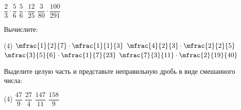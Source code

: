 \begin{class}[number=6]
\begin{listofex}
\begin{tasks}
		\task \( \dfrac{2}{3}\cdot\dfrac{5}{6} \)
		\task \( \dfrac{5}{6}\cdot\dfrac{12}{25} \)
		\task \( \dfrac{3}{80}\cdot\dfrac{100}{291} \)
	\end{tasks}
	\item Вычислите:
		\begin{tasks}(4)
		\task \( \mfrac{1}{2}{7}\cdot\mfrac{1}{1}{3} \)
		\task \( \mfrac{4}{2}{3}\cdot\mfrac{2}{2}{5} \)
		\task \( \mfrac{3}{5}{6}\cdot\mfrac{1}{7}{23} \)
		\task \( \mfrac{7}{3}{11}\cdot\mfrac{2}{19}{40} \)
	\end{tasks}
	\item Выделите целую часть и представьте неправильную дробь в виде смешанного числа:
		\begin{tasks}(4)
		\task \( \dfrac{47}{9} \)
		\task \( \dfrac{27}{4} \)
		\task \( \dfrac{147}{11} \)
		\task \( \dfrac{158}{9} \)
	\end{tasks}
\end{listofex}
\end{class}
%
%
